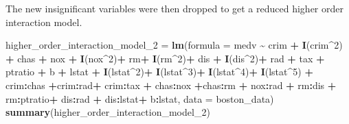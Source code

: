 \documentclass[
]{article}
\newenvironment{Shaded}{\begin{snugshade}}{\end{snugshade}}
\newcommand{\AttributeTok}[1]{\textcolor[rgb]{0.13,0.29,0.53}{#1}}
\newcommand{\DecValTok}[1]{\textcolor[rgb]{0.00,0.00,0.81}{#1}}
\newcommand{\FunctionTok}[1]{\textcolor[rgb]{0.13,0.29,0.53}{\textbf{#1}}}
\newcommand{\NormalTok}[1]{#1}
\newcommand{\OtherTok}[1]{\textcolor[rgb]{0.56,0.35,0.01}{#1}}
\newcommand{\SpecialCharTok}[1]{\textcolor[rgb]{0.81,0.36,0.00}{\textbf{#1}}}
\begin{document}
The new insignificant variables were then dropped to get a reduced
higher order interaction model.

\begin{Shaded}
\begin{Highlighting}[]
\NormalTok{higher\_order\_interaction\_model\_2 }\OtherTok{=} \FunctionTok{lm}\NormalTok{(}\AttributeTok{formula =}\NormalTok{ medv }\SpecialCharTok{\textasciitilde{}}\NormalTok{ crim }\SpecialCharTok{+} \FunctionTok{I}\NormalTok{(crim}\SpecialCharTok{\^{}}\DecValTok{2}\NormalTok{) }\SpecialCharTok{+}\NormalTok{ chas }\SpecialCharTok{+}\NormalTok{ nox }\SpecialCharTok{+} \FunctionTok{I}\NormalTok{(nox}\SpecialCharTok{\^{}}\DecValTok{2}\NormalTok{)}\SpecialCharTok{+}\NormalTok{ rm}\SpecialCharTok{+} \FunctionTok{I}\NormalTok{(rm}\SpecialCharTok{\^{}}\DecValTok{2}\NormalTok{)}\SpecialCharTok{+}\NormalTok{ dis }\SpecialCharTok{+} \FunctionTok{I}\NormalTok{(dis}\SpecialCharTok{\^{}}\DecValTok{2}\NormalTok{)}\SpecialCharTok{+}\NormalTok{ rad }\SpecialCharTok{+}\NormalTok{ tax }\SpecialCharTok{+}\NormalTok{ ptratio }\SpecialCharTok{+}\NormalTok{ b }\SpecialCharTok{+}\NormalTok{ lstat }\SpecialCharTok{+} \FunctionTok{I}\NormalTok{(lstat}\SpecialCharTok{\^{}}\DecValTok{2}\NormalTok{)}\SpecialCharTok{+} \FunctionTok{I}\NormalTok{(lstat}\SpecialCharTok{\^{}}\DecValTok{3}\NormalTok{)}\SpecialCharTok{+} \FunctionTok{I}\NormalTok{(lstat}\SpecialCharTok{\^{}}\DecValTok{4}\NormalTok{)}\SpecialCharTok{+} \FunctionTok{I}\NormalTok{(lstat}\SpecialCharTok{\^{}}\DecValTok{5}\NormalTok{) }\SpecialCharTok{+}\NormalTok{ crim}\SpecialCharTok{:}\NormalTok{chas  }\SpecialCharTok{+}\NormalTok{crim}\SpecialCharTok{:}\NormalTok{rad}\SpecialCharTok{+}\NormalTok{ crim}\SpecialCharTok{:}\NormalTok{tax }\SpecialCharTok{+}\NormalTok{ chas}\SpecialCharTok{:}\NormalTok{nox }\SpecialCharTok{+}\NormalTok{chas}\SpecialCharTok{:}\NormalTok{rm }\SpecialCharTok{+}\NormalTok{ nox}\SpecialCharTok{:}\NormalTok{rad }\SpecialCharTok{+}\NormalTok{ rm}\SpecialCharTok{:}\NormalTok{dis }\SpecialCharTok{+}\NormalTok{ rm}\SpecialCharTok{:}\NormalTok{ptratio}\SpecialCharTok{+}\NormalTok{ dis}\SpecialCharTok{:}\NormalTok{rad }\SpecialCharTok{+}\NormalTok{ dis}\SpecialCharTok{:}\NormalTok{lstat}\SpecialCharTok{+}\NormalTok{ b}\SpecialCharTok{:}\NormalTok{lstat, }\AttributeTok{data =}\NormalTok{ boston\_data)}
\FunctionTok{summary}\NormalTok{(higher\_order\_interaction\_model\_2)}
\end{Highlighting}
\end{Shaded}
\end{document}
